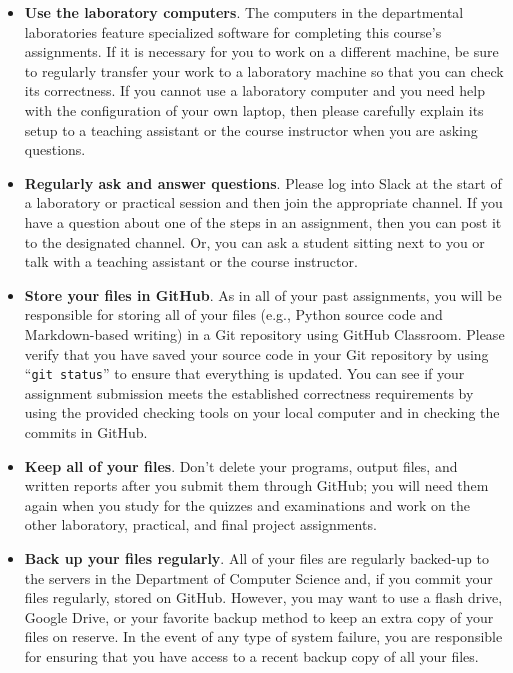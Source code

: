 \documentclass[11pt]{article}
\newcommand{\command}[1]{``\lstinline{#1}''}
\begin{document}
\begin{itemize}
  \setlength{\itemsep}{0pt}

\item {\bf Use the laboratory computers}. The computers in the departmental
  laboratories feature specialized software for completing this course's
  assignments. If it is necessary for you to work on a different machine, be
  sure to regularly transfer your work to a laboratory machine so that you can
  check its correctness. If you cannot use a laboratory computer and you need
  help with the configuration of your own laptop, then please carefully explain
  its setup to a teaching assistant or the course instructor when you are asking
  questions.

\item {\bf Regularly ask and answer questions}. Please log into Slack at the
  start of a laboratory or practical session and then join the appropriate
  channel. If you have a question about one of the steps in an assignment, then
  you can post it to the designated channel. Or, you can ask a student sitting
  next to you or talk with a teaching assistant or the course instructor.

\item {\bf Store your files in GitHub}. As in all of your past assignments, you
  will be responsible for storing all of your files (e.g., Python source code and
  Markdown-based writing) in a Git repository using GitHub Classroom. Please
  verify that you have saved your source code in your Git repository by using
  \command{git status} to ensure that everything is updated. You can see if
  your assignment submission meets the established correctness requirements by
  using the provided checking tools on your local computer and in checking the
  commits in GitHub.

\item {\bf Keep all of your files}. Don't delete your programs, output files,
  and written reports after you submit them through GitHub; you will need them
  again when you study for the quizzes and examinations and work on the other
  laboratory, practical, and final project assignments.

\item {\bf Back up your files regularly}. All of your files are regularly
  backed-up to the servers in the Department of Computer Science and, if you
  commit your files regularly, stored on GitHub. However, you may want to use a
  flash drive, Google Drive, or your favorite backup method to keep an extra
  copy of your files on reserve. In the event of any type of system failure,
  you are responsible for ensuring that you have access to a recent backup copy
  of all your files.


\end{itemize}
\end{document}
